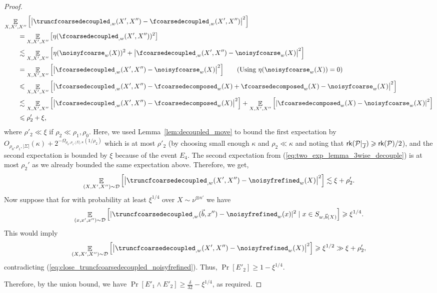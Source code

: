 \documentclass[11pt]{article}
\newcommand\card[1]{\left| {#1} \right|}
\newcommand\Expect[2]{{\mathop{\mathbb{E}}_{#1}\left[ {#2} \right]}}
\renewcommand\geq{\geqslant}
\renewcommand\leq{\leqslant}
\newcommand{\V}[1]{{#1}}
\begin{document}
\begin{proof}
\begingroup
\allowdisplaybreaks
\begin{align*}
    &\Expect{X, X', X''}{\card{\truncfcoarsedecoupled_{, \V w}(X',X'') - \fcoarsedecoupled_{, \V w}(X',X'')}^2} \\
    & \quad\quad=  \Expect{X, X', X''}{\eta(\fcoarsedecoupled_{, \V w}(X',X''))^2}\\
    & \quad\quad\lesssim  \Expect{X, X', X''}{\eta(\noisyfcoarse_{\V w}(X))^2 + \card{\fcoarsedecoupled_{, \V w}(X',X'') - \noisyfcoarse_{\V w}(X)}^2} \\
    & \quad\quad =  \Expect{X, X', X''}{\card{\fcoarsedecoupled_{, \V w}(X',X'') - \noisyfcoarse_{\V w}(X)}^2} \tag*{(Using $\eta(\noisyfcoarse_{\V w}(X))=0$)}\\
   & \quad\quad\leq \Expect{X, X', X''}{\card{\fcoarsedecoupled_{, \V w}(X',X'') - \fcoarsedecomposed_{\V w}(X) + \fcoarsedecomposed_{\V w}(X) - \noisyfcoarse_{\V w}(X)}^2} \\
      & \quad\quad\lesssim  \Expect{X, X', X''}{\card{\fcoarsedecoupled_{, \V w}(X',X'') - \fcoarsedecomposed_{\V w}(X)}^2} + \Expect{X, X', X''}{\card{\fcoarsedecomposed_{\V w}(X) - \noisyfcoarse_{\V w}(X)}^2} \\
  & \quad\quad\leq \rho_2' + \xi,
\end{align*}
\endgroup
where $\rho'_2\ll \xi$ if $\rho_2 \ll \rho_1, \rho_0$. Here, we used Lemma~\ref{lem:decoupled_move} to bound the first expectation by  $O_{\rho_0, \rho_1,|\Sigma|}(\kappa) +  2^{-\Omega_{\rho_0, \rho_1,|\Sigma|, \kappa}(1/\rho_2)}$ which is at most $\rho'_2$ (by choosing small enough $\kappa$ and $\rho_2 \ll \kappa$ and noting that ${\sf rk}(\mathcal{P}|_{\overline{J}})\geq {\sf rk}(\mathcal{P})/2$), and the second expectation is bounded by $\xi$ because of the event $E_4$.
The second expectation from (\ref{eq:two_exp_lemma_3wise_decouple}) is at most $\rho_2'$ as we already bounded the same expectation above. Therefore, we get,
\begin{equation}\label{eq:close_truncfcoarsedecoupled_noisyfrefined}
\Expect{(X,X',X'')\sim \mathcal{D}}{\card{\truncfcoarsedecoupled_{,\V w}(X',X'') - \noisyfrefined_{\V w}(X)}^2}\lesssim \xi + \rho'_2.
\end{equation}
Now suppose that for with probability at least $\xi^{1/4}$ over $X\sim \nu^{\otimes n'}$ we have 
$$\Expect{(\V x, \V x', \V x'')\sim \mathcal{D}}{|\truncfcoarsedecoupled_{,\V w}(\vec{b},\V x'')  - \noisyfrefined_{\V w}(\V x)|^2 \mid \V x\in S_{\V w, \vec{b}(X)}} \geq \xi^{1/4}.$$
This would imply
$$\Expect{(X,X',X'')\sim \mathcal{D}}{\card{\truncfcoarsedecoupled_{,\V w}(X',X'') - \noisyfrefined_{\V w}(X)}^2}\geq \xi^{1/2} \gg  \xi + \rho'_2,$$
contradicting (\ref{eq:close_truncfcoarsedecoupled_noisyfrefined}). Thus, $\Pr[E'_2] \geq 1-\xi^{1/4}$.

Therefore, by the union bound, we have $\Pr[E'_1\wedge E'_2] \geq \frac{\delta}{32} - \xi^{1/4}$, as required.
\end{proof}
\end{document}
